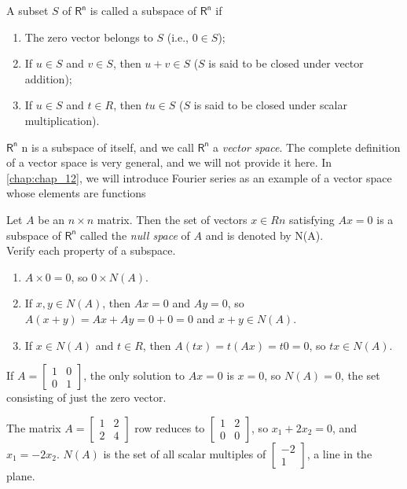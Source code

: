 \documentclass[../main.tex]{subfiles}
\begin{document}
\begin{definition}
	\label{defn:defn_3_1}
	A subset $S$ of $\mathsf{R^n}$ is called a subspace of $\mathsf{R^n}$ if

\begin{enumerate}[label=\textbf{\arabic*. }, noitemsep]
	\item The zero vector belongs to $S$ (i.e., $0 \in S$);
	\item If $u \in S$ and $v \in S$, then $u + v \in S$ ($S$ is said to be closed under vector addition);
	\item If $u \in S$ and $t \in R$, then $t u \in S$ ($S$ is said to be closed under scalar multiplication).
\end{enumerate}

$\mathsf{R^n}$ n is a subspace of itself, and we call $\mathsf{R^n}$ a \emph{vector space}. The complete definition of a vector space is very general, and
we will not provide it here. In \autoref{chap:chap_12}, we will introduce Fourier series as an example of a vector space whose elements are functions
\end{definition}

\begin{example} Let $A$ be an $n \times n$ matrix. Then the set of vectors $x \in Rn$ satisfying $A x = 0$ is a subspace of $\mathsf{R^n}$ called the \emph{null space} of $A$ and is denoted by N(A).\\
Verify each property of a subspace.
\begin{enumerate}[label=\textbf{\arabic*. }, noitemsep]
	 \item $A \times 0 = 0$, so $0 \times N(A)$.
	\item  If $x, y \in N(A)$, then $A x = 0$ and $A y = 0$, so $A(x + y) = Ax + Ay= 0 + 0 = 0$ and $x + y \in N(A).$
	\item If $x \in N(A)$ and $t \in R$, then $A(tx) = t(Ax) = t0 = 0$, so $tx \in N(A).$
\end{enumerate}
\end{example}

\begin{example} If $A =\begin{bmatrix} 1& 0\\ 0&1\end{bmatrix}$, the only solution to $Ax = 0$ is $x = 0$, so $N(A) = {0}$, the set consisting of just the zero vector.

The matrix $A =\begin{bmatrix} 1& 2\\ 2&4\end{bmatrix}$
row reduces to $\begin{bmatrix} 1& 2\\ 0 & 0 \end{bmatrix}$, so $x_1 +2x_2 = 0$,
and $x_1 = -2x_2$. $N(A)$ is the set of all scalar multiples of  $\begin{bmatrix} -2\\ 1 \end{bmatrix}$, a line in the plane.
\end{example}
\end{document}
